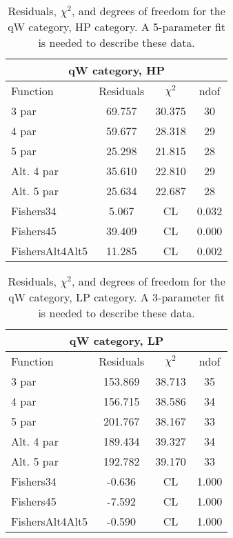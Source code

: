 \begin{table}[htb]
\centering
\begin{tabular}{|l c c c |}
\hline
\multicolumn{4}{|c|}{qW category, HP}\\
\hline
Function & Residuals & $\chi^2$ & ndof \\
\hline
3 par & 69.757 & 30.375 & 30 \\
4 par & 59.677 & 28.318 & 29 \\
5 par & 25.298 & 21.815 & 28 \\
Alt. 4 par& 35.610 & 22.810 & 29 \\
Alt. 5 par& 25.634 & 22.687 & 28 \\
\hline
\hline
Fishers34  & 5.067 & CL & 0.032\\
Fishers45  & 39.409 & CL & 0.000\\
FishersAlt4Alt5  & 11.285 & CL & 0.002\\
\hline
\end{tabular}
\caption{Residuals, $\chi^{2}$, and degrees of freedom for the qW category, HP category. A 5-parameter fit is needed to describe these data.}
\label{tab:qW category, HP}
\end{table}
\begin{table}[htb]
\centering
\begin{tabular}{|l c c c |}
\hline
\multicolumn{4}{|c|}{qW category, LP}\\
\hline
Function & Residuals & $\chi^2$ & ndof \\
\hline
3 par & 153.869 & 38.713 & 35 \\
4 par & 156.715 & 38.586 & 34 \\
5 par & 201.767 & 38.167 & 33 \\
Alt. 4 par& 189.434 & 39.327 & 34 \\
Alt. 5 par& 192.782 & 39.170 & 33 \\
\hline
\hline
Fishers34  & -0.636 & CL & 1.000\\
Fishers45  & -7.592 & CL & 1.000\\
FishersAlt4Alt5  & -0.590 & CL & 1.000\\
\hline
\end{tabular}
\caption{Residuals, $\chi^{2}$, and degrees of freedom for the qW category, LP category. A 3-parameter fit is needed to describe these data.}
\label{tab:qW category, LP}
\end{table}
